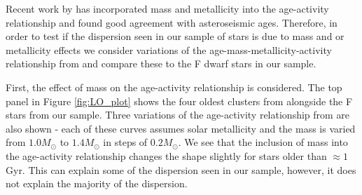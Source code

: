 Recent work by \citet{Lorenzo_Oliveira_etal_2016} has incorporated mass and metallicity into the age-activity relationship and found good agreement with asteroseismic ages. Therefore, in order to test if the dispersion seen in our sample of stars is due to mass and or metallicity effects we consider variations of the age-mass-metallicity-activity relationship from \citet{Lorenzo_Oliveira_etal_2016} and compare these to the F dwarf stars in our sample.

First, the effect of mass on the age-activity relationship is considered. The top panel in Figure \ref{fig:LO_plot} shows the four oldest clusters from \citet{Mamajek_Hillenbrand_2008} alongside the F stars from our sample. Three variations of the age-activity relationship from \citet{Lorenzo_Oliveira_etal_2016} are also shown - each of these curves assumes solar metallicity and the mass is varied from $1.0 M_{\odot}$ to $1.4 M_{\odot}$ in steps of $0.2 M_{\odot}$. We see that the inclusion of mass into the age-activity relationship changes the shape slightly for stars older than $\approx 1$ Gyr. This can explain some of the dispersion seen in our sample, however, it does not explain the majority of the dispersion.

